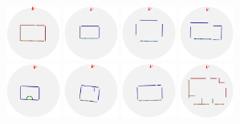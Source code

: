 \begin{figure}[t]
\begin{minipage}[c]{4.7in}
  \includegraphics[width=0.7in]{../gi2012_userstudy/images/section3/0_2D_walls_rotate_edit} %
  \includegraphics[width=0.7in]{../gi2012_userstudy/images/section3/6_2D_walls_rotate} %
  \includegraphics[width=0.7in]{../gi2012_userstudy/images/section3/7_2D_walls_rotate} %
  \includegraphics[width=0.7in]{../gi2012_userstudy/images/section3/8_2D_walls_rotate}\\ %
  \includegraphics[width=0.7in]{../gi2012_userstudy/images/section3/2_2D_walls_rotate} %
  \includegraphics[width=0.7in]{../gi2012_userstudy/images/section3/3_2D_walls_rotate} %
  \includegraphics[width=0.7in]{../gi2012_userstudy/images/section3/4_2D_walls_rotate} %
  \includegraphics[width=0.7in]{../gi2012_userstudy/images/section3/9_2D_walls_rotate} %

\end{minipage}
\end{figure}
